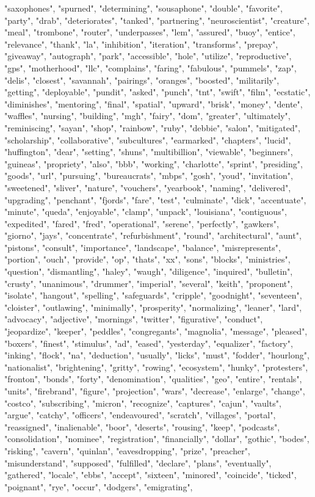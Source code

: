 "saxophones", "spurned", "determining", "sousaphone", "double", "favorite", "party", "drab", "deteriorates", "tanked", "partnering", "neuroscientist", "creature", "meal", "trombone", "router", "underpasses", "lem", "assured", "buoy", "entice", "relevance", "thank", "la", "inhibition", "iteration", "transforms", "prepay", "giveaway", "autograph", "park", "accessible", "hole", "utilize", "reproductive", "gps", "motherhood", "llc", "complains", "faring", "fabulous", "pummels", "zap", "delis", "closest", "savannah", "pairings", "oranges", "boosted", "militarily", "getting", "deployable", "pundit", "asked", "punch", "tnt", "swift", "film", "ecstatic", "diminishes", "mentoring", "final", "spatial", "upward", "brisk", "money", "dente", "waffles", "nursing", "building", "mgh", "fairy", "dom", "greater", "ultimately", "reminiscing", "sayan", "shop", "rainbow", "ruby", "debbie", "salon", "mitigated", "scholarship", "collaborative", "subcultures", "earmarked", "chapters", "lucid", "huffington", "dear", "setting", "shuns", "multibillion", "viewable", "beginners", "guineas", "propriety", "also", "bbb", "working", "charlotte", "sprint", "presiding", "goods", "url", "pursuing", "bureaucrats", "mbps", "gosh", "youd", "invitation", "sweetened", "sliver", "nature", "vouchers", "yearbook", "naming", "delivered", "upgrading", "penchant", "fjords", "fare", "test", "culminate", "dick", "accentuate", "minute", "queda", "enjoyable", "clamp", "unpack", "louisiana", "contiguous", "expedited", "fared", "fred", "operational", "serene", "perfectly", "gawkers", "giorno", "jays", "concentrate", "refurbishment", "round", "architectural", "aunt", "pistons", "consult", "importance", "landscape", "balance", "misrepresents", "portion", "ouch", "provide", "op", "thats", "xx", "sons", "blocks", "ministries", "question", "dismantling", "haley", "waugh", "diligence", "inquired", "bulletin", "crusty", "unanimous", "drummer", "imperial", "several", "keith", "proponent", "isolate", "hangout", "spelling", "safeguards", "cripple", "goodnight", "seventeen", "cloister", "outlawing", "minimally", "prosperity", "normalizing", "leaner", "lard", "advocacy", "adjective", "mornings", "twitter", "figurative", "conduct", "jeopardize", "keeper", "peddles", "congregants", "magnolia", "message", "pleased", "boxers", "finest", "stimulus", "ad", "eased", "yesterday", "equalizer", "factory", "inking", "flock", "na", "deduction", "usually", "licks", "must", "fodder", "hourlong", "nationalist", "brightening", "gritty", "rowing", "ecosystem", "hunky", "protesters", "fronton", "bonds", "forty", "denomination", "qualities", "geo", "entire", "rentals", "units", "firebrand", "figure", "projection", "wars", "decrease", "enlarge", "change", "costco", "subscribing", "micron", "recognize", "captures", "cajun", "vaults", "argue", "catchy", "officers", "endeavoured", "scratch", "villages", "portal", "reassigned", "inalienable", "boor", "deserts", "rousing", "keep", "podcasts", "consolidation", "nominee", "registration", "financially", "dollar", "gothic", "bodes", "risking", "cavern", "quinlan", "eavesdropping", "prize", "preacher", "misunderstand", "supposed", "fulfilled", "declare", "plans", "eventually", "gathered", "locale", "ebbs", "accept", "sixteen", "minored", "coincide", "ticked", "poignant", "rye", "occur", "dodgers", "emigrating", 